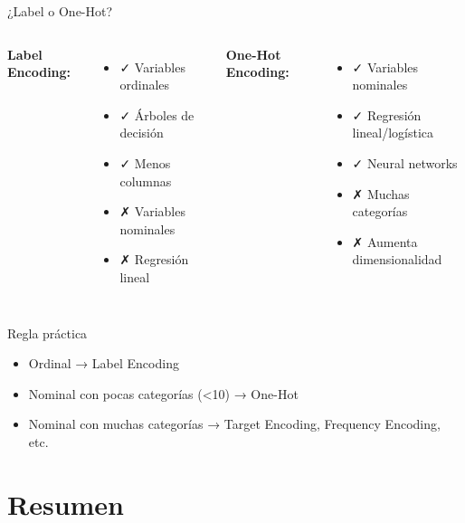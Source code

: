 \documentclass[aspectratio=169]{beamer}
\begin{document}
\begin{frame}{¿Label o One-Hot?}
\begin{columns}[t]
\textbf{Label Encoding:}
\begin{itemize}
    \item ✓ Variables ordinales
    \item ✓ Árboles de decisión
    \item ✓ Menos columnas
    \item ✗ Variables nominales
    \item ✗ Regresión lineal
\end{itemize}

\textbf{One-Hot Encoding:}
\begin{itemize}
    \item ✓ Variables nominales
    \item ✓ Regresión lineal/logística
    \item ✓ Neural networks
    \item ✗ Muchas categorías
    \item ✗ Aumenta dimensionalidad
\end{itemize}
\end{columns}

\vspace{1em}

\begin{exampleblock}{Regla práctica}
\begin{itemize}
    \item Ordinal → Label Encoding
    \item Nominal con pocas categorías (<10) → One-Hot
    \item Nominal con muchas categorías → Target Encoding, Frequency Encoding, etc.
\end{itemize}
\end{exampleblock}
\end{frame}

\section{Resumen}
\end{document}

